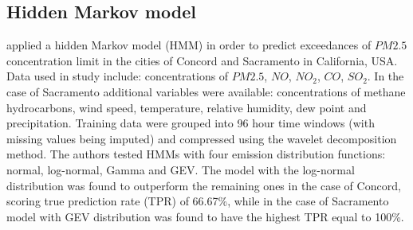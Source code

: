 \subsection{Hidden Markov model}
\cite{SUN201393} applied a hidden Markov model (HMM) in order to predict exceedances of $PM2.5$ concentration limit in the cities of Concord and Sacramento in California, USA. Data used in study include: concentrations of $PM2.5$, $NO$, $NO_2$, $CO$, $SO_2$. In the case of Sacramento additional variables were available: concentrations of methane hydrocarbons, wind speed, temperature, relative humidity, dew point and precipitation. Training data were grouped into 96 hour time windows (with missing values being imputed) and compressed using the wavelet decomposition method. The authors tested HMMs with four emission distribution functions: normal, log-normal, Gamma and GEV. The model with the log-normal distribution was found to outperform the remaining ones in the case of Concord, scoring true prediction rate (TPR) of 66.67\%, while in the case of Sacramento model with GEV distribution was found to have the highest TPR equal to 100\%.


